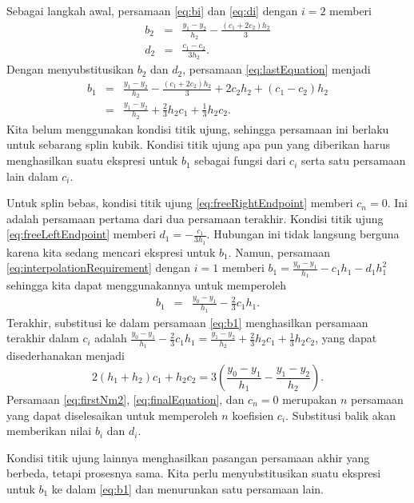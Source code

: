 Sebagai langkah awal, persamaan \ref{eq:bi} dan \ref{eq:di} dengan
$i=2$ memberi
\begin{eqnarray*}
b_{2} & = & \frac{y_{1}-y_{2}}{h_{2}}-\frac{(c_{1}+2c_{2})h_{2}}{3}\\
d_{2} & = & \frac{c_{1}-c_{2}}{3h_{2}}.
\end{eqnarray*}
Dengan menyubstitusikan $b_{2}$ dan $d_{2}$, persamaan \ref{eq:lastEquation}
menjadi 
\begin{eqnarray}
b_{1} & = & \frac{y_{1}-y_{2}}{h_{2}}-\frac{(c_{1}+2c_{2})h_{2}}{3}+2c_{2}h_{2}+(c_{1}-c_{2})h_{2}\nonumber \\
 & = & \frac{y_{1}-y_{2}}{h_{2}}+\frac{2}{3}h_{2}c_{1}+\frac{1}{3}h_{2}c_{2}.\label{eq:b1}
\end{eqnarray}
Kita belum menggunakan kondisi titik ujung, sehingga persamaan ini
berlaku untuk sebarang splin kubik. Kondisi titik ujung apa pun yang
diberikan harus menghasilkan suatu ekspresi untuk $b_{1}$ sebagai
fungsi dari $c_{i}$ serta satu persamaan lain dalam $c_{i}$.

Untuk splin bebas, kondisi titik ujung \ref{eq:freeRightEndpoint}
memberi $c_{n}=0$. Ini adalah persamaan pertama dari dua persamaan
terakhir. Kondisi titik ujung \ref{eq:freeLeftEndpoint} memberi $d_{1}=-\frac{c_{1}}{3h_{1}}$.
Hubungan ini tidak langsung berguna karena kita sedang mencari ekspresi
untuk $b_{1}$. Namun, persamaan \ref{eq:interpolationRequirement}
dengan $i=1$ memberi $b_{1}=\frac{y_{0}-y_{1}}{h_{1}}-c_{1}h_{1}-d_{1}h_{1}^{2}$
sehingga kita dapat menggunakannya untuk memperoleh 
\begin{eqnarray*}
b_{1} & = & \frac{y_{0}-y_{1}}{h_{1}}-\frac{2}{3}c_{1}h_{1}.
\end{eqnarray*}
Terakhir, substitusi ke dalam persamaan \ref{eq:b1} menghasilkan
persamaan terakhir dalam $c_{i}$ adalah $\frac{y_{0}-y_{1}}{h_{1}}-\frac{2}{3}c_{1}h_{1}=\frac{y_{1}-y_{2}}{h_{2}}+\frac{2}{3}h_{2}c_{1}+\frac{1}{3}h_{2}c_{2}$,
yang dapat disederhanakan menjadi
\begin{equation}
2(h_{1}+h_{2})c_{1}+h_{2}c_{2}=3\left(\frac{y_{0}-y_{1}}{h_{1}}-\frac{y_{1}-y_{2}}{h_{2}}\right).\label{eq:finalEquation}
\end{equation}
Persamaan \ref{eq:firstNm2}, \ref{eq:finalEquation}, dan $c_{n}=0$
merupakan $n$ persamaan yang dapat diselesaikan untuk memperoleh
$n$ koefisien $c_{i}$. Substitusi balik akan memberikan nilai $b_{i}$
dan $d_{i}$.

Kondisi titik ujung lainnya menghasilkan pasangan persamaan akhir
yang berbeda, tetapi prosesnya sama. Kita perlu menyubstitusikan suatu
ekspresi untuk $b_{1}$ ke dalam \ref{eq:b1} dan menurunkan satu
persamaan lain.


